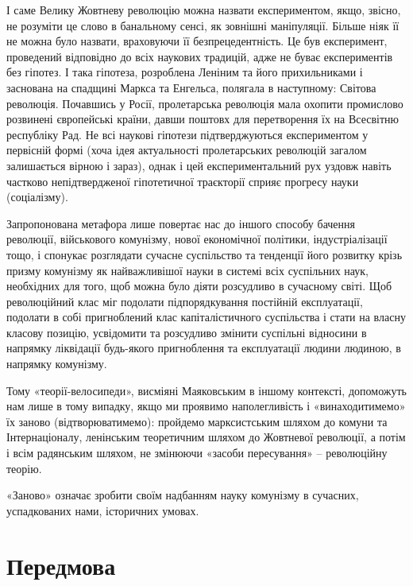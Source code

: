 \documentclass[12pt,a4paper,openany]{book}
\begin{document}
І саме Велику Жовтневу революцію можна назвати експериментом, якщо, звісно, не розуміти це слово в банальному сенсі, як зовнішні маніпуляції. Більше ніяк її не можна було назвати, враховуючи її безпрецедентність. Це був експеримент, проведений відповідно до всіх наукових традицій, адже не буває експериментів без гіпотез. І така гіпотеза, розроблена Леніним та його прихильниками і заснована на спадщині Маркса та Енгельса, полягала в наступному: Світова революція. Почавшись у Росії, пролетарська революція мала охопити промислово розвинені європейські країни, давши поштовх для перетворення їх на Всесвітню республіку Рад. Не всі наукові гіпотези підтверджуються експериментом у первісній формі (хоча ідея актуальності пролетарських революцій загалом залишається вірною і зараз), однак і цей експериментальний рух уздовж навіть частково непідтвердженої гіпотетичної траєкторії сприяє прогресу науки (соціалізму).

Запропонована метафора лише повертає нас до іншого способу бачення революції, військового комунізму, нової економічної політики, індустріалізації тощо, і спонукає розглядати сучасне суспільство та тенденції його розвитку крізь призму комунізму як найважливішої науки в системі всіх суспільних наук, необхідних для того, щоб можна було діяти розсудливо в сучасному світі. Щоб революційний клас міг подолати підпорядкування постійній експлуатації, подолати в собі пригноблений клас капіталістичного суспільства і стати на власну класову позицію, усвідомити та розсудливо змінити суспільні відносини в напрямку ліквідації будь-якого пригноблення та експлуатації людини людиною, в напрямку комунізму.

Тому «теорії-велосипеди», висміяні Маяковським в іншому контексті, допоможуть нам лише в тому випадку, якщо ми проявимо наполегливість і «винаходитимемо» їх заново (відтворюватимемо): пройдемо марксистським шляхом до комуни та Інтернаціоналу, ленінським теоретичним шляхом до Жовтневої революції, а потім і всім радянським шляхом, не змінюючи «засоби пересування» – революційну теорію.

«Заново» означає зробити своїм надбанням науку комунізму в сучасних, успадкованих нами, історичних умовах.
\ifSubfilesClassLoaded{\setcounter{page}{7}}{}
\section{Передмова}
\label{sec:02_predislovie}
\end{document}
